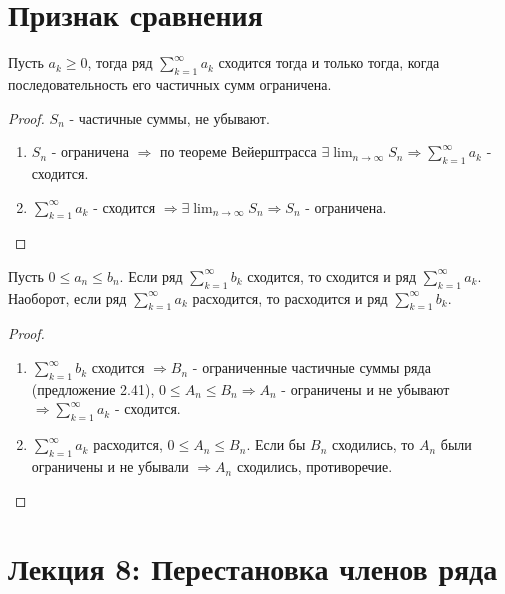 	\section{Признак сравнения}
	
	\begin{sentence}
		Пусть $a_k \geqslant 0$, тогда ряд $\sum^{\infty}_{k = 1} a_k$ сходится тогда и только тогда, когда последовательность его частичных сумм ограничена.
	\end{sentence}
	
	\begin{proof}
		$S_n$ - частичные суммы, не убывают.
		\begin{enumerate}
			\item $S_n$ - ограничена $\Rightarrow$ по теореме Вейерштрасса $\exists \lim_{n \to \infty} S_n \Rightarrow \sum^{\infty}_{k = 1} a_k$ - сходится.
			\item $\sum^{\infty}_{k = 1} a_k$ - сходится $\Rightarrow \exists \lim_{n \to \infty} S_n \Rightarrow S_n$ - ограничена.
		\end{enumerate}
	\end{proof}
	
	\begin{sentence}
		Пусть $0 \leqslant a_n \leqslant b_n$. Если ряд $\sum^{\infty}_{k = 1} b_k$ сходится, то сходится и ряд $\sum^{\infty}_{k = 1} a_k$. Наоборот, если ряд $\sum^{\infty}_{k = 1}	a_k$ расходится, то расходится и ряд $\sum^{\infty}_{k = 1} b_k.$
	\end{sentence}
	
	\begin{proof}
		\begin{enumerate}
			\item $\sum^{\infty}_{k = 1} b_k$ сходится $\Rightarrow B_n$ - ограниченные частичные суммы ряда (предложение 2.41), $0 \leqslant A_n \leqslant B_n \Rightarrow A_n$ - ограничены и не убывают $\Rightarrow \sum^{\infty}_{k = 1} a_k$ - сходится.
			\item $\sum^{\infty}_{k = 1} a_k$ расходится, $0 \leqslant A_n \leqslant B_n$. Если бы $B_n$ сходились, то $A_n$ были ограничены и не убывали $\Rightarrow A_n$ сходились, противоречие.
		\end{enumerate}
	\end{proof}
	
	\newpage
	
	\section*{Лекция 8: Перестановка членов ряда}
	
